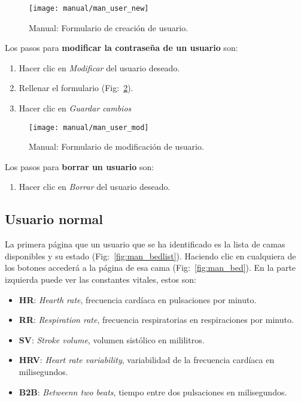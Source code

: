 \begin{figure}
	\centering
	\texttt{[image: manual/man\_user\_new]}
	\caption{Manual: Formulario de creación de usuario.}
	\label{fig:man_new_user}
\end{figure}

Los pasos para \textbf{modificar la contraseña de un usuario} son:
\begin{enumerate}
	\item Hacer clic en \textit{Modificar} del usuario deseado.
	\item Rellenar el formulario (Fig:~\ref{fig:man_mod_user}).
	\item Hacer clic en \textit{Guardar cambios}
\end{enumerate}

\begin{figure}
	\centering
	\texttt{[image: manual/man\_user\_mod]}
	\caption{Manual: Formulario de modificación de usuario.}
	\label{fig:man_mod_user}
\end{figure}

Los pasos para \textbf{borrar un usuario} son:
\begin{enumerate}
	\item Hacer clic en \textit{Borrar} del usuario deseado.
\end{enumerate}

\subsection{Usuario normal}\label{sec:normal_tuto}

La primera página que un usuario que se ha identificado es la lista de camas disponibles y su estado (Fig:~\ref{fig:man_bedlist}). Haciendo clic en cualquiera de los botones accederá a la página de esa cama (Fig:~\ref{fig:man_bed}). En la parte izquierda puede ver las constantes vitales, estos son:
\begin{itemize}
	\item \textbf{HR}: \textit{Hearth rate}, frecuencia cardíaca en pulsaciones por minuto.
	\item \textbf{RR}: \textit{Respiration rate}, frecuencia respiratorias en respiraciones por minuto.
	\item \textbf{SV}: \textit{Stroke volume}, volumen sistólico en mililitros.
	\item \textbf{HRV}: \textit{Heart rate variability}, variabilidad de la frecuencia cardíaca en milisegundos.
	\item \textbf{B2B}: \textit{Betweenn two beats}, tiempo entre dos pulsaciones en milisegundos.
\end{itemize}

